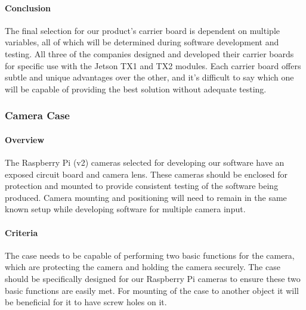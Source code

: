 \paragraph{Conclusion}

The final selection for our product's carrier board is dependent on multiple variables, 
all of which will be determined during software development and testing. All three of 
the companies 
designed and developed their carrier boards for specific use with the Jetson TX1 and 
TX2 modules. Each carrier board offers subtle and unique 
advantages over the other, and it's difficult to say which one will be capable of 
providing the best solution without adequate testing. \\

\subsubsection{Camera Case}

\paragraph{Overview}

The Raspberry Pi (v2) cameras selected for developing our software have an exposed circuit 
board and camera lens. These cameras should be enclosed for protection and mounted to 
provide consistent testing of the software being produced. Camera mounting and positioning
will need to remain in the same known setup while developing software for multiple camera 
input. \\

\paragraph{Criteria}

The case needs to be capable of performing two basic functions for the camera, which 
are protecting the camera and holding the camera securely. The case should be specifically 
designed for our Raspberry Pi cameras to ensure these two basic functions are easily 
met. For mounting of the case to another object it will be beneficial for it to 
have screw holes on it. \\

